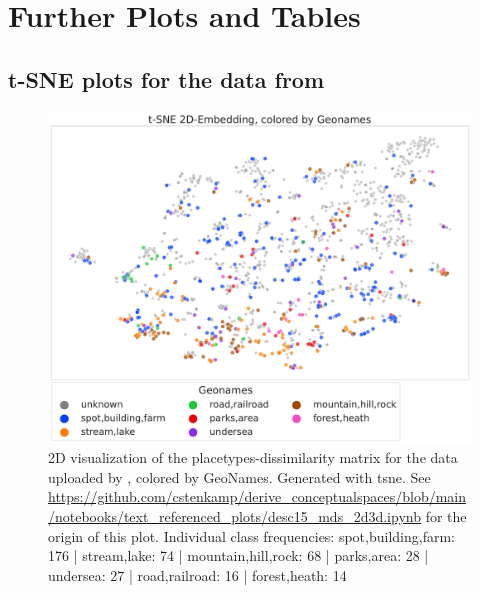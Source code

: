 \chapter{Further Plots and Tables}
\label{ap:more_plots}

\section{t-SNE plots for the data from \cite{Derrac2015}}

\begin{figure}[h]
	\begin{center}
	  \includegraphics[width=\textwidth]{graphics/figures/scatter_mds_tsne_places_Geonames.pdf}
	  \caption[2D visualization of the placetypes-dissimilarity matrix]{2D visualization of the placetypes-dissimilarity matrix for the data uploaded by \textcite{Derrac2015}, colored by GeoNames. Generated with \gls{tsne}. See \url{https://github.com/cstenkamp/derive_conceptualspaces/blob/main/notebooks/text_referenced_plots/desc15_mds_2d3d.ipynb} for the origin of this plot. Individual class frequencies: spot,building,farm: 176 | stream,lake: 74 | mountain,hill,rock: 68 | parks,area: 28 | undersea: 27 | road,railroad: 16 | forest,heath: 14}
	  \label{fig:scatter_mds_placetypes}
	\end{center}
\end{figure}

